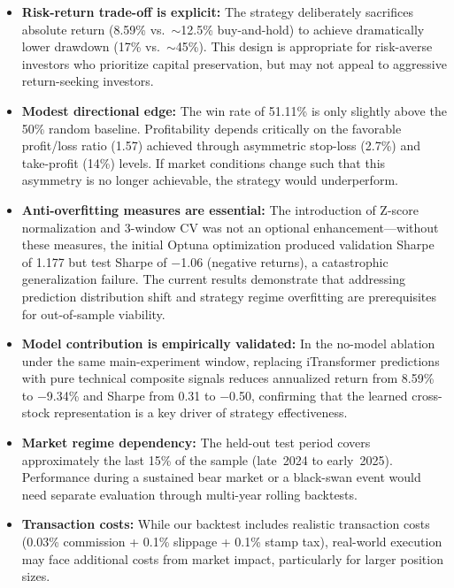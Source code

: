 \documentclass[12pt, a4paper]{article}
\begin{document}
\begin{itemize}[leftmargin=2em]
    \item \textbf{Risk-return trade-off is explicit:} The strategy deliberately sacrifices absolute return (8.59\% vs.\ $\sim$12.5\% buy-and-hold) to achieve dramatically lower drawdown (17\% vs.\ $\sim$45\%). This design is appropriate for risk-averse investors who prioritize capital preservation, but may not appeal to aggressive return-seeking investors.

    \item \textbf{Modest directional edge:} The win rate of 51.11\% is only slightly above the 50\% random baseline. Profitability depends critically on the favorable profit/loss ratio (1.57) achieved through asymmetric stop-loss (2.7\%) and take-profit (14\%) levels. If market conditions change such that this asymmetry is no longer achievable, the strategy would underperform.

    \item \textbf{Anti-overfitting measures are essential:} The introduction of Z-score normalization and 3-window CV was not an optional enhancement---without these measures, the initial Optuna optimization produced validation Sharpe of 1.177 but test Sharpe of $-$1.06 (negative returns), a catastrophic generalization failure. The current results demonstrate that addressing prediction distribution shift and strategy regime overfitting are prerequisites for out-of-sample viability.

    \item \textbf{Model contribution is empirically validated:} In the no-model ablation under the same main-experiment window, replacing iTransformer predictions with pure technical composite signals reduces annualized return from 8.59\% to $-$9.34\% and Sharpe from 0.31 to $-$0.50, confirming that the learned cross-stock representation is a key driver of strategy effectiveness.

    \item \textbf{Market regime dependency:} The held-out test period covers approximately the last 15\% of the sample (late~2024 to early~2025). Performance during a sustained bear market or a black-swan event would need separate evaluation through multi-year rolling backtests.
    
    \item \textbf{Transaction costs:} While our backtest includes realistic transaction costs (0.03\% commission + 0.1\% slippage + 0.1\% stamp tax), real-world execution may face additional costs from market impact, particularly for larger position sizes.
\end{itemize}
\end{document}
